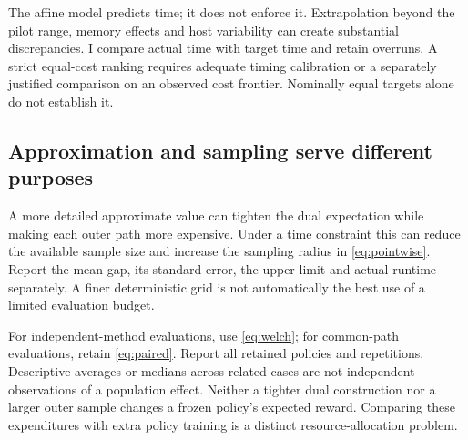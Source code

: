 The affine model predicts time; it does not enforce it. Extrapolation beyond the pilot range, memory effects and host variability can create substantial discrepancies. I compare actual time with target time and retain overruns. A strict equal-cost ranking requires adequate timing calibration or a separately justified comparison on an observed cost frontier. Nominally equal targets alone do not establish it.

\subsection{Approximation and sampling serve different purposes}

A more detailed approximate value can tighten the dual expectation while making each outer path more expensive. Under a time constraint this can reduce the available sample size and increase the sampling radius in \eqref{eq:pointwise}. Report the mean gap, its standard error, the upper limit and actual runtime separately. A finer deterministic grid is not automatically the best use of a limited evaluation budget.

For independent-method evaluations, use \eqref{eq:welch}; for common-path evaluations, retain \eqref{eq:paired}. Report all retained policies and repetitions. Descriptive averages or medians across related cases are not independent observations of a population effect. Neither a tighter dual construction nor a larger outer sample changes a frozen policy's expected reward. Comparing these expenditures with extra policy training is a distinct resource-allocation problem.
